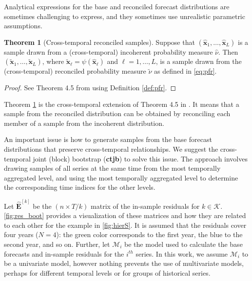 \documentclass[a4paper,11pt]{article}
\newcommand{\xvet}{\bm{x}}
\newcommand{\Evet}{\bm{E}}
\theoremstyle{definition}
\newtheorem{theorem}{Theorem}[section]
\begin{document}
Analytical expressions for the base and reconciled forecast distributions are sometimes challenging to express, and they sometimes use unrealistic parametric assumptions.

\begin{theorem}[Cross-temporal reconciled samples] \label{thm:rs}
	Suppose that $(\widehat{\xvet}_1, \dots, \widehat{\xvet}_L)$ is a sample drawn from a (cross-temporal) incoherent probability measure $\widehat{\nu}$. Then $(\widetilde{\xvet}_1, \dots, \widetilde{\xvet}_L)$, where $\widetilde{\xvet}_\ell=\psi(\widehat{\xvet}_\ell)$ and $\ell= 1, \dots, L$, is a sample drawn from the (cross-temporal) reconciled probability measure $\widetilde{\nu}$ as defined in \eqref{eq:pfr}.
\end{theorem}
\begin{proof}
	See Theorem 4.5 from \cite{panagiotelis2023} using Definition \ref{def:pfr}.
\end{proof}
Theorem \ref{thm:rs} is the cross-temporal extension of Theorem 4.5 in \cite{panagiotelis2023}. It means that a sample from the reconciled distribution can be obtained by reconciling each member of a sample from the incoherent distribution.

An important issue is how to generate samples from the base forecast distributions that preserve cross-temporal relationships. We suggest the cross-temporal joint (block) bootstrap (\textbf{ctjb}) to solve this issue. The approach involves drawing samples of all series at the same time from the most temporally aggregated level, and using the most temporally aggregated level to determine the corresponding time indices for the other levels.

Let $\widehat{\Evet}^{[k]}$ be the $(n \times T/k)$ matrix of the in-sample residuals for $k \in \mathcal{K}$. \autoref{fig:res_boot} provides a visualization of these matrices and how they are related to each other for the example in \autoref{fig:hierS}. It is assumed that the residuals cover four years ($N=4$): the green color corresponds to the first year, the blue to the second year, and so on. Further, let $\mathcal{M}_i$ be the model used to calculate the base forecasts and in-sample residuals for the $i^{th}$ series. In this work, we assume $\mathcal{M}_i$ to be a univariate model, however nothing prevents the use of multivariate models, perhaps for different temporal levels or for groups of historical series.




\end{document}
